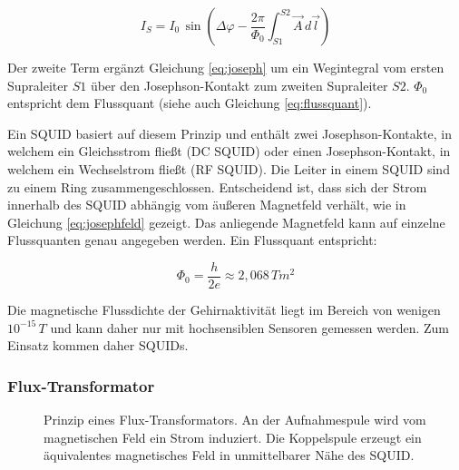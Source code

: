 \documentclass[doc,a4paper,12pt]{apa6}
\begin{document}
\begin{equation}
\label{eq:josephfeld}
I_S = I_0\,\sin{\left( \Delta \varphi - \frac{2\pi}{\Phi_0} \int_{S1}^{S2} \vec{A}\,d\vec{l} \right)}
\end{equation}

Der zweite Term ergänzt Gleichung \ref{eq:joseph} um ein Wegintegral vom ersten Supraleiter $S1$ über den Josephson-Kontakt zum zweiten Supraleiter $S2$. $\Phi_0$ entspricht dem Flussquant (siehe auch Gleichung \ref{eq:flussquant}).

Ein SQUID basiert auf diesem Prinzip und enthält zwei Josephson-Kontakte, in welchem ein Gleichsstrom fließt (DC SQUID) oder einen Josephson-Kontakt, in welchem ein Wechselstrom fließt (RF SQUID). Die Leiter in einem SQUID sind zu einem Ring zusammengeschlossen. Entscheidend ist, dass sich der Strom innerhalb des SQUID abhängig vom äußeren Magnetfeld verhält, wie in Gleichung \ref{eq:josephfeld} gezeigt. Das anliegende Magnetfeld kann auf einzelne Flussquanten genau angegeben werden. Ein Flussquant entspricht:

\begin{equation}
\label{eq:flussquant}
\Phi_0 = \frac{h}{2e} \approx 2,068\,Tm^2
\end{equation}

Die magnetische Flussdichte der Gehirnaktivität liegt im Bereich von wenigen $10^{-15}\,T$ und kann daher nur mit hochsensiblen Sensoren gemessen werden. Zum Einsatz kommen daher SQUIDs.

\subsubsection{Flux-Transformator}

\begin{figure}[t]
  \centering
  \setlength{\fboxsep}{8mm}
  \vspace*{3mm}
  \caption[Prinzip eines Flux-Transformators]{Prinzip eines Flux-Transformators. An der Aufnahmespule wird vom magnetischen Feld ein Strom induziert. Die Koppelspule erzeugt ein äquivalentes magnetisches Feld in unmittelbarer Nähe des SQUID.}
  \label{img:flux-trafo}
\end{figure}
\end{document}
